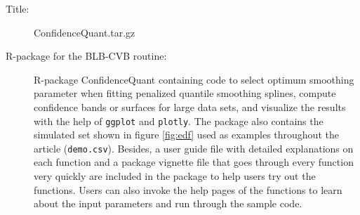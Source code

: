 \documentclass{statsoc}
\begin{document}
\begin{description}

\item[Title:] ConfidenceQuant.tar.gz

\item[R-package for the BLB-CVB routine:] R-package ConfidenceQuant containing code to select optimum smoothing parameter when fitting penalized quantile smoothing splines, compute confidence bands or surfaces for large data sets, and visualize the results with the help of \texttt{ggplot} and \texttt{plotly}. The package also contains the simulated set shown in figure \ref{fig:edf} used as examples throughout the article (\texttt{demo.csv}). Besides, a user guide file with detailed explanations on each function and a package vignette file that goes through every function very quickly are included in the package to help users try out the functions. Users can also invoke the help pages of the functions to learn about the input parameters and run through the sample code.

\end{description}


\end{document}
